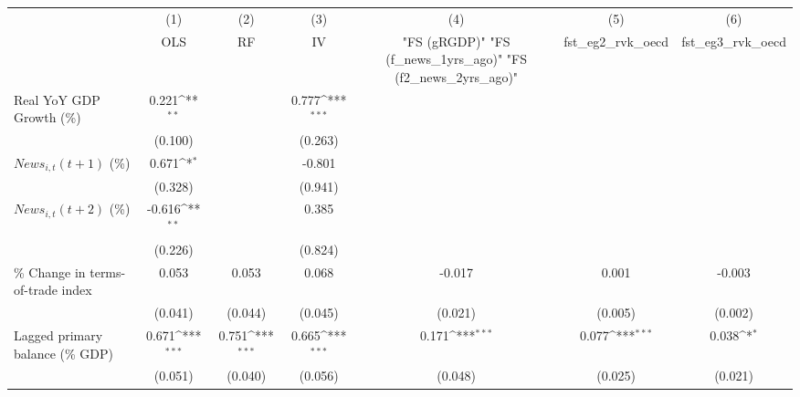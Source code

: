 {
\def\sym#1{\ifmmode^{#1}\else\(^{#1}\)\fi}
\begin{tabular}{l*{6}{c}}
\toprule
                    &\multicolumn{1}{c}{(1)}&\multicolumn{1}{c}{(2)}&\multicolumn{1}{c}{(3)}&\multicolumn{1}{c}{(4)}&\multicolumn{1}{c}{(5)}&\multicolumn{1}{c}{(6)}\\
                    &\multicolumn{1}{c}{OLS}&\multicolumn{1}{c}{RF}&\multicolumn{1}{c}{IV}&\multicolumn{1}{c}{ "FS (gRGDP)"  "FS (f_news_1yrs_ago)"  "FS (f2_news_2yrs_ago)" }&\multicolumn{1}{c}{fst_eg2_rvk_oecd}&\multicolumn{1}{c}{fst_eg3_rvk_oecd}\\
\midrule
Real YoY GDP Growth (\%)&       0.221\sym{**} &                     &       0.777\sym{***}&                     &                     &                     \\
                    &     (0.100)         &                     &     (0.263)         &                     &                     &                     \\
\addlinespace
$ News_{i,t}(t+1)$ (\%)&       0.671\sym{*}  &                     &      -0.801         &                     &                     &                     \\
                    &     (0.328)         &                     &     (0.941)         &                     &                     &                     \\
\addlinespace
$ News_{i,t}(t+2)$ (\%)&      -0.616\sym{**} &                     &       0.385         &                     &                     &                     \\
                    &     (0.226)         &                     &     (0.824)         &                     &                     &                     \\
\addlinespace
\% Change in terms-of-trade index&       0.053         &       0.053         &       0.068         &      -0.017         &       0.001         &      -0.003         \\
                    &     (0.041)         &     (0.044)         &     (0.045)         &     (0.021)         &     (0.005)         &     (0.002)         \\
\addlinespace
Lagged primary balance (\% GDP)&       0.671\sym{***}&       0.751\sym{***}&       0.665\sym{***}&       0.171\sym{***}&       0.077\sym{***}&       0.038\sym{*}  \\
                    &     (0.051)         &     (0.040)         &     (0.056)         &     (0.048)         &     (0.025)         &     (0.021)         \\

\end{tabular}}
